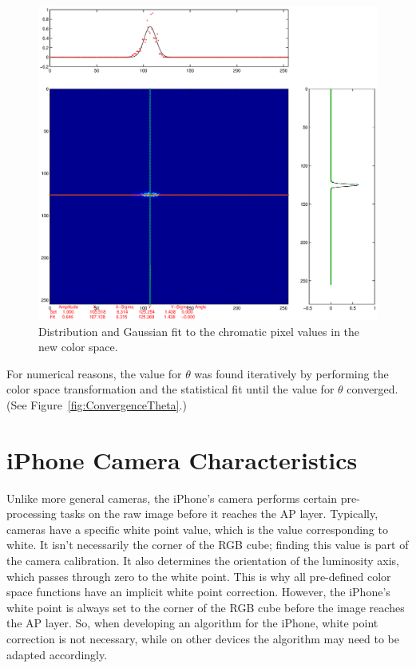 \begin{figure}[h!]
  \centering
    \includegraphics[width=\textwidth]{Chapter2/Figs/crosshairFigureFinal.eps}
    \caption{Distribution and Gaussian fit to the chromatic pixel values in the new color space.}  \label{fig:DistributionAndGaussianFit}
\end{figure}


For numerical reasons, the value for $\theta$ was found iteratively by performing the color space transformation and the statistical fit until the value for $\theta$ converged. (See Figure~\ref{fig:ConvergenceTheta}.)

\section{iPhone Camera Characteristics} \label{sec:iPhoneCameraCharacteristics}

Unlike more general cameras, the iPhone's camera performs certain pre-processing tasks on the raw image before it reaches the AP layer. Typically, cameras have a specific white point value, which is the value corresponding to white. It isn't necessarily the corner of the RGB cube; finding this value is part of the camera calibration. It also determines the orientation of the luminosity axis, which passes through zero to the white point. This is why all pre-defined color space functions have an implicit white point correction. However, the iPhone's white point is always set to the corner of the RGB cube before the image reaches the AP layer. So, when developing an algorithm for the iPhone, white point correction is not necessary, while on other devices the algorithm may need to be adapted accordingly.

